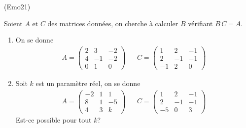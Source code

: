 \begin{tiny}(Emo21)\end{tiny} Soient $A$ et $C$ des matrices données, on cherche à calculer $B$ vérifiant $B\,C = A$.
\begin{enumerate}
 \item On se donne
\begin{align*}
A = 
\begin{pmatrix}
2 & 3 & -2 \\ 4 & -1 & -2 \\ 0 & 1 & 0 
\end{pmatrix}
& &
C =
\begin{pmatrix}
1 & 2 & -1 \\ 2 & -1 & -1 \\ -1 & 2 & 0 
\end{pmatrix}
\end{align*}
\item Soit $k$ est un paramètre réel, on se donne 
\begin{align*}
A = 
\begin{pmatrix}
-2 & 1 & 1 \\ 8 & 1 & -5 \\ 4 & 3 & k 
\end{pmatrix}
& &
C =
\begin{pmatrix}
1 & 2 & -1 \\ 2 & -1 & -1 \\ -5 & 0 & 3 
\end{pmatrix}
\end{align*}
Est-ce possible pour tout $k$? 
\end{enumerate}
 